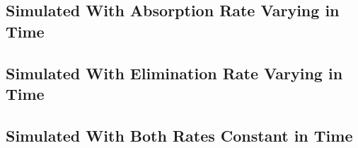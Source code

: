 \documentclass{article}
\begin{document}
\subsection{Simulated With Absorption Rate Varying in Time}
%
\subsection{Simulated With Elimination Rate Varying in Time}
%
\subsection{Simulated With Both Rates Constant in Time}
\end{document}
